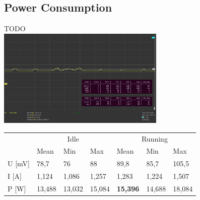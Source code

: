 \documentclass{beamer}
\begin{document}

\subsection{Power Consumption}
\begin{frame}{\subsecname}
\centering
TODO\\
\includegraphics[width=8cm]{images/power_consumption.jpg}\\\vspace{0.5cm}
\begin{tabular}{lllllll}
\toprule
& \multicolumn{3}{c}{Idle} & \multicolumn{3}{c}{Running} \\
& Mean & Min & Max & Mean & Min & Max \\
\midrule
U [mV] & 78,7 & 76 & 88 & 89,8 & 85,7 & 105,5 \\
I [A] & 1,124 & 1,086 & 1,257 & 1,283 & 1,224 & 1,507 \\
P [W] & 13,488 & 13,032 & 15,084 & \textbf{15,396} & 14,688 & 18,084 \\
\bottomrule
\end{tabular}
\end{frame}
\end{document}
